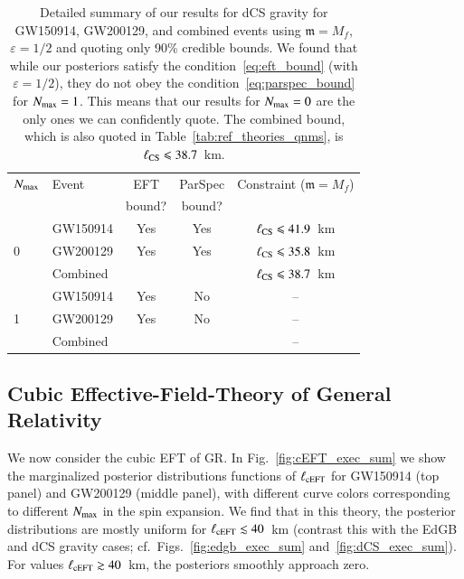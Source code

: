 \documentclass[twocolumn,
               prd,
               aps,
               superscriptaddress,
               tightenlines,
               nofootinbib,
               eqsecnum,
               amsfonts,
               amsmath,
               longbibliography]{revtex4-1}
\newcommand{\gm}{\mathfrak{m}}
\begin{document}
\begin{table}[h]
\begin{tabular}{l l c c c}
\hline
\hline
$N_{\rm max}$ & Event & EFT    & ParSpec & Constraint ($\gm = M_{f}$) \\
              &       & bound? & bound?  &                            \\
\hline
      & GW150914 & Yes & Yes & $\ell_{\rm CS} \leqslant 41.9$~km \\
0     & GW200129 & Yes & Yes & $\ell_{\rm CS} \leqslant 35.8$~km \\
      & Combined &     &     & \cellcolor{black!10}$\ell_{\rm CS} \leqslant 38.7$~km \\
\hline
      & GW150914 & Yes & No  & --                                 \\
1     & GW200129 & Yes & No  & --                                 \\
      & Combined &     &     & --                                 \\
\hline
\hline
\end{tabular}
\caption{Detailed summary of our results for dCS gravity for GW150914, GW200129, and
combined events using $\gm = M_{f}$, $\varepsilon = 1/2$ and quoting only 90\% credible bounds.
%
We found that while our posteriors satisfy the condition~\eqref{eq:eft_bound} (with $\varepsilon = 1/2$),
they do not obey the condition~\eqref{eq:parspec_bound} for $N_{\rm max} = 1$. This means
that our results for $N_{\rm max}=0$ are the only ones we can confidently quote.
%
The combined bound, which is also quoted in Table~\ref{tab:ref_theories_qnms},
is $\ell_{\rm CS} \leqslant 38.7$~km.
}
\label{tab:summary_dcs}
\end{table}

\subsection{Cubic Effective-Field-Theory of General Relativity}
\label{sec:results_ceft}

We now consider the cubic EFT of GR.
%
In Fig.~\ref{fig:cEFT_exec_sum} we show the marginalized posterior distributions
functions of $\ell_{\rm cEFT}$ for GW150914 (top panel) and GW200129 (middle panel),
with different curve colors corresponding to different $N_{\rm max}$ in
the spin expansion.
%
We find that in this theory, the posterior distributions are mostly uniform for
$\ell_{\rm cEFT} \lesssim 40$~km (contrast this with the EdGB and dCS gravity
cases; cf.~Figs.~\ref{fig:edgb_exec_sum} and~\ref{fig:dCS_exec_sum}).
%
For values $\ell_{\rm cEFT} \gtrsim 40$~km, the posteriors smoothly approach zero.
\end{document}
